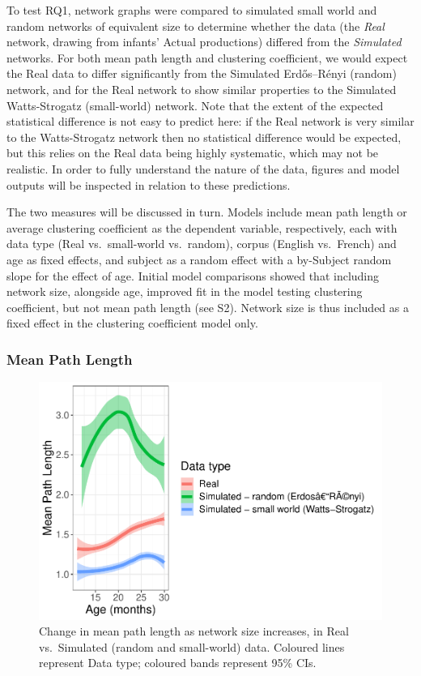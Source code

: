 \documentclass[
  man]{apa6}
\begin{document}
To test RQ1, network graphs were compared to simulated small world and random networks of equivalent size to determine whether the data (the \emph{Real} network, drawing from infants' Actual productions) differed from the \emph{Simulated} networks. For both mean path length and clustering coefficient, we would expect the Real data to differ significantly from the Simulated Erdős--Rényi (random) network, and for the Real network to show similar properties to the Simulated Watts-Strogatz (small-world) network. Note that the extent of the expected statistical difference is not easy to predict here: if the Real network is very similar to the Watts-Strogatz network then no statistical difference would be expected, but this relies on the Real data being highly systematic, which may not be realistic. In order to fully understand the nature of the data, figures and model outputs will be inspected in relation to these predictions.

The two measures will be discussed in turn. Models include mean path length or average clustering coefficient as the dependent variable, respectively, each with data type (Real vs.~small-world vs.~random), corpus (English vs.~French) and age as fixed effects, and subject as a random effect with a by-Subject random slope for the effect of age. Initial model comparisons showed that including network size, alongside age, improved fit in the model testing clustering coefficient, but not mean path length (see S2). Network size is thus included as a fixed effect in the clustering coefficient model only.

\hypertarget{mean-path-length}{%
\subsubsection{Mean Path Length}\label{mean-path-length}}

\begin{figure}
\centering
\includegraphics{NetworkGraphs_files/figure-latex/Figure-path-length-1.pdf}
\caption{\label{fig:Figure-path-length}Change in mean path length as network size increases, in Real vs.~Simulated (random and small-world) data. Coloured lines represent Data type; coloured bands represent 95\% CIs.}
\end{figure}
\end{document}
